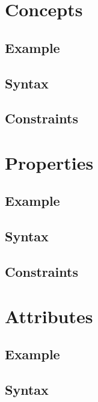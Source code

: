 \documentclass[a4paper,oneside,12pt, extrafontsizes]{memoir}
\begin{document}
\chapter{Concepts}
\label{ch:concepts}


\section{Example}


\section{Syntax}


\section{Constraints}


\chapter{Properties}
\label{ch:properties}


\section{Example}


\section{Syntax}


\section{Constraints}


\chapter{Attributes}
\label{ch:attributes}


\section{Example}


\section{Syntax}

\end{document}
